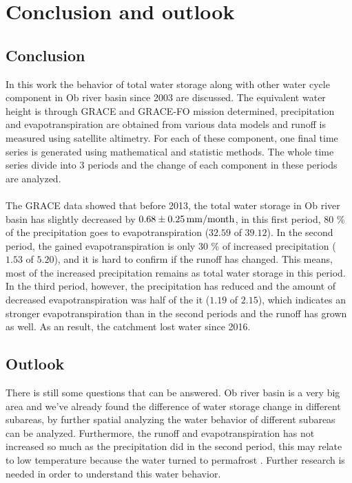 \chapter{Conclusion and outlook}
\section{Conclusion}
In this work the behavior of total water storage along with other water cycle component in Ob river basin since 2003 are discussed. The equivalent water height is through GRACE and GRACE-FO mission determined, precipitation and evapotranspiration are obtained from various data models and runoff is measured using satellite altimetry. For each of these component, one final time series is generated using mathematical and statistic methods. The whole time series divide into 3 periods and the change of each component in these periods are analyzed. \\\\
The GRACE data showed that before 2013, the total water storage in Ob river basin has slightly decreased by $0.68 \pm 0.25 \,\mathrm{mm/month}$, in this first period, 80 \% of the precipitation goes to evapotranspiration ($32.59$ of $39.12$). In the second period, the gained evapotranspiration is only 30 \% of increased precipitation ($1.53$ of $5.20$), and it is hard to confirm if the runoff has changed. This means, most of the increased precipitation remains as total water storage in this period. In the third period, however, the precipitation has reduced and the amount of decreased evapotranspiration was half of the it ($1.19$ of $2.15$), which indicates an stronger evapotranspiration than in the second periods and the runoff has grown as well. As an result, the catchment lost water since 2016.
\section{Outlook}
There is still some questions that can be answered. Ob river basin is a very big area and we've already found the difference of water storage change in different subareas, by further spatial analyzing the water behavior of different subareas can be analyzed. Furthermore, the runoff and evapotranspiration has not increased so much as the precipitation did in the second period, this may relate to low temperature because the water turned to permafrost \cite{young2020conceptual}. Further research is needed in order to understand this water behavior. 
 